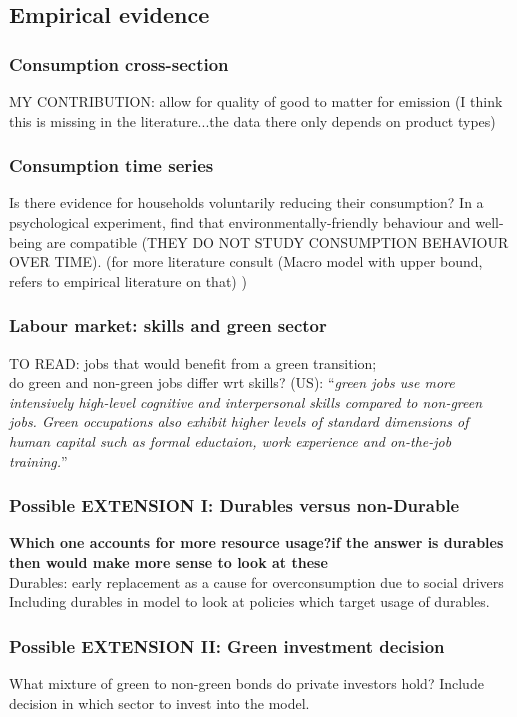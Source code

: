 \subsection{Empirical evidence}


\subsubsection{Consumption cross-section }
MY CONTRIBUTION: allow for quality of good to matter for emission (I think this is missing in the literature...the data there only depends on product types)

\subsubsection{Consumption time series}
Is there evidence for households voluntarily reducing their consumption? In a psychological experiment, \cite{Brown2005AreLifestyle} find that environmentally-friendly behaviour and well-being are compatible (THEY DO NOT STUDY CONSUMPTION BEHAVIOUR OVER TIME). 
(\ar for more literature consult \cite{Heikkinen2015DegrowthConsumers} (Macro model with upper bound, refers to empirical literature on that)
)

\subsubsection{Labour market: skills and green sector}
TO READ: \cite{Bowen2018CharacterisingComposition} jobs that would benefit from a green transition; \\
\cite{Consoli2016DoCapital} do green and non-green jobs differ wrt skills? (US): ``\textit{green jobs use more intensively high-level cognitive and interpersonal skills compared to non-green jobs. Green occupations also exhibit higher levels of standard dimensions of human capital such as formal eductaion, work experience and on-the-job training.}''

\subsubsection{Possible EXTENSION I: Durables versus non-Durable}
\textbf{Which one accounts for more resource usage?\ar if the answer is durables then would make more sense to look at these}
\\
Durables: early replacement as a cause for overconsumption due to social drivers \citep{Hou2020FeelingsIntentions}
\\ 
Including durables in model to look at policies which target usage of durables.
\subsubsection{Possible EXTENSION II: Green investment decision}
What mixture of green to non-green bonds do private investors hold? Include decision in which sector to invest into the model.